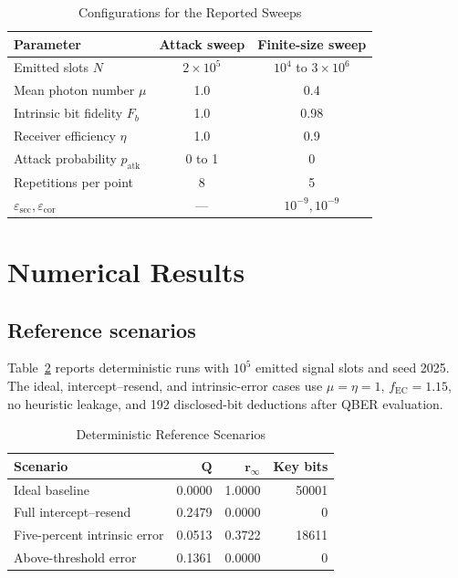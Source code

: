 \documentclass[conference]{IEEEtran}
\begin{document}
\begin{table}[t]
\caption{Configurations for the Reported Sweeps}
\label{tab:settings}
\centering
\footnotesize
\setlength{\tabcolsep}{3pt}
\begin{tabular}{lcc}
\hline
\textbf{Parameter} & \textbf{Attack sweep} & \textbf{Finite-size sweep}\\
\hline
Emitted slots \(N\) & \(2\times10^5\) & \(10^4\) to \(3\times10^6\)\\
Mean photon number \(\mu\) & 1.0 & 0.4\\
Intrinsic bit fidelity \(F_b\) & 1.0 & 0.98\\
Receiver efficiency \(\eta\) & 1.0 & 0.9\\
Attack probability \(p_{\mathrm{atk}}\) & 0 to 1 & 0\\
Repetitions per point & 8 & 5\\
\(\varepsilon_{\mathrm{sec}},\varepsilon_{\mathrm{cor}}\) & --- & \(10^{-9},10^{-9}\)\\
\hline
\end{tabular}
\end{table}

\section{Numerical Results}

\subsection{Reference scenarios}

Table~\ref{tab:scenarios} reports deterministic runs with \(10^5\) emitted
signal slots and seed 2025. The ideal, intercept--resend, and intrinsic-error
cases use \(\mu=\eta=1\), \(f_{\mathrm{EC}}=1.15\), no heuristic leakage, and
192 disclosed-bit deductions after QBER evaluation.

\begin{table}[t]
\caption{Deterministic Reference Scenarios}
\label{tab:scenarios}
\centering
\footnotesize
\setlength{\tabcolsep}{3.5pt}
\begin{tabular}{lrrr}
\hline
\textbf{Scenario} & \(\boldsymbol{Q}\) & \(\boldsymbol{r_{\infty}}\) &
\textbf{Key bits}\\
\hline
Ideal baseline & 0.0000 & 1.0000 & 50001\\
Full intercept--resend & 0.2479 & 0.0000 & 0\\
Five-percent intrinsic error & 0.0513 & 0.3722 & 18611\\
Above-threshold error & 0.1361 & 0.0000 & 0\\
\hline
\end{tabular}
\end{table}
\end{document}
